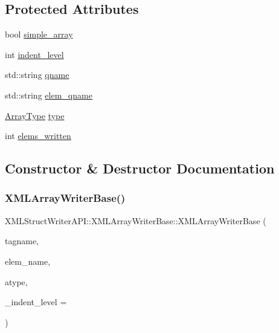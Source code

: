 \subsection*{Protected Attributes}
\begin{DoxyCompactItemize}
\item 
bool \mbox{\hyperlink{classXMLStructWriterAPI_1_1XMLArrayWriterBase_a404ef854a3fb879b58182431f042a849}{simple\+\_\+array}}
\item 
int \mbox{\hyperlink{classXMLStructWriterAPI_1_1XMLArrayWriterBase_ac27f8ee3bc74448bce22008dd40bf8da}{indent\+\_\+level}}
\item 
std\+::string \mbox{\hyperlink{classXMLStructWriterAPI_1_1XMLArrayWriterBase_a8f37d964908f9b5b246f49be05e7426b}{qname}}
\item 
std\+::string \mbox{\hyperlink{classXMLStructWriterAPI_1_1XMLArrayWriterBase_ad82542571b1fe5dfe92473a37cdce886}{elem\+\_\+qname}}
\item 
\mbox{\hyperlink{namespaceXMLStructWriterAPI_a2017208be87c77a32bdc19ea2f14d032}{Array\+Type}} \mbox{\hyperlink{classXMLStructWriterAPI_1_1XMLArrayWriterBase_a3cf99febdb592458a83224b027233ed3}{type}}
\item 
int \mbox{\hyperlink{classXMLStructWriterAPI_1_1XMLArrayWriterBase_a0763b71be02a920a6278c5fd18110497}{elems\+\_\+written}}
\end{DoxyCompactItemize}


\subsection{Constructor \& Destructor Documentation}
\mbox{\label{classXMLStructWriterAPI_1_1XMLArrayWriterBase_a0df8629240d895664bd6e2dce1b53691}} 
\subsubsection{\texorpdfstring{XMLArrayWriterBase()}{XMLArrayWriterBase()}\hspace{0.1cm}{\footnotesize\ttfamily [1/2]}}
{\footnotesize\ttfamily X\+M\+L\+Struct\+Writer\+A\+P\+I\+::\+X\+M\+L\+Array\+Writer\+Base\+::\+X\+M\+L\+Array\+Writer\+Base (\begin{DoxyParamCaption}\item[{const std\+::string \&}]{tagname,  }\item[{const std\+::string \&}]{elem\+\_\+name,  }\item[{\mbox{\hyperlink{namespaceXMLStructWriterAPI_a2017208be87c77a32bdc19ea2f14d032}{Array\+Type}}}]{atype,  }\item[{int}]{\+\_\+indent\+\_\+level = {} }\end{DoxyParamCaption})\hspace{0.3cm}{\ttfamily [inline]}}

